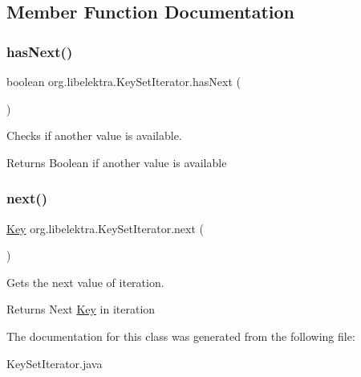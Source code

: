 \subsection{Member Function Documentation}
\mbox{\label{classorg_1_1libelektra_1_1KeySetIterator_a5e1ac38d123fdf1613f9a9258ef009a7}} 
\subsubsection{\texorpdfstring{has\+Next()}{hasNext()}}
{\footnotesize\ttfamily boolean org.\+libelektra.\+Key\+Set\+Iterator.\+has\+Next (\begin{DoxyParamCaption}{ }\end{DoxyParamCaption})\hspace{0.3cm}{\ttfamily [inline]}}



Checks if another value is available. 

\begin{DoxyReturn}{Returns}
Boolean if another value is available 
\end{DoxyReturn}
\mbox{\label{classorg_1_1libelektra_1_1KeySetIterator_aaa1cd283e898fd4c96ec44faade6effd}} 
\subsubsection{\texorpdfstring{next()}{next()}}
{\footnotesize\ttfamily \hyperlink{classorg_1_1libelektra_1_1Key}{Key} org.\+libelektra.\+Key\+Set\+Iterator.\+next (\begin{DoxyParamCaption}{ }\end{DoxyParamCaption})\hspace{0.3cm}{\ttfamily [inline]}}



Gets the next value of iteration. 

\begin{DoxyReturn}{Returns}
Next \hyperlink{classorg_1_1libelektra_1_1Key}{Key} in iteration 
\end{DoxyReturn}


The documentation for this class was generated from the following file\+:\begin{DoxyCompactItemize}
\item 
Key\+Set\+Iterator.\+java\end{DoxyCompactItemize}
